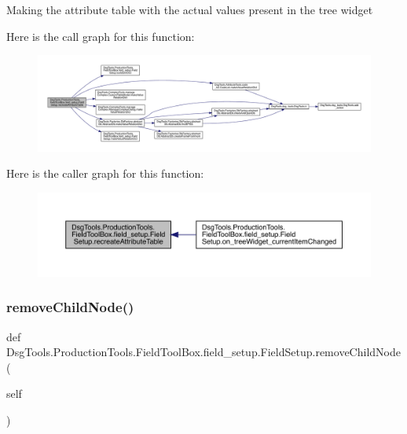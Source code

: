 \begin{DoxyVerb}Making the attribute table with the actual values present in the tree widget
\end{DoxyVerb}
 Here is the call graph for this function\+:
\nopagebreak
\begin{figure}[H]
\begin{center}
\leavevmode
\includegraphics[width=350pt]{class_dsg_tools_1_1_production_tools_1_1_field_tool_box_1_1field__setup_1_1_field_setup_a5e7e4796f0eff36255c4d66ccc268b8d_cgraph}
\end{center}
\end{figure}
Here is the caller graph for this function\+:
\nopagebreak
\begin{figure}[H]
\begin{center}
\leavevmode
\includegraphics[width=350pt]{class_dsg_tools_1_1_production_tools_1_1_field_tool_box_1_1field__setup_1_1_field_setup_a5e7e4796f0eff36255c4d66ccc268b8d_icgraph}
\end{center}
\end{figure}
\mbox{\label{class_dsg_tools_1_1_production_tools_1_1_field_tool_box_1_1field__setup_1_1_field_setup_ab4cb7ebc5baf632cc4c4eb5b4c6e2b54}} 
\subsubsection{\texorpdfstring{remove\+Child\+Node()}{removeChildNode()}}
{\footnotesize\ttfamily def Dsg\+Tools.\+Production\+Tools.\+Field\+Tool\+Box.\+field\+\_\+setup.\+Field\+Setup.\+remove\+Child\+Node (\begin{DoxyParamCaption}\item[{}]{self }\end{DoxyParamCaption})}


